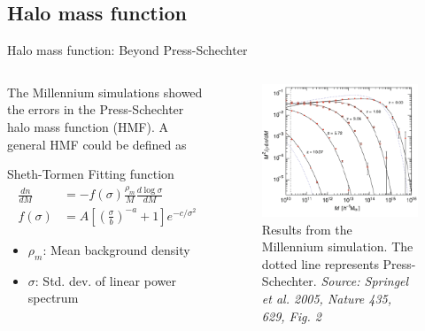 \documentclass{beamer}
\begin{document}
\subsection{Halo mass function}
	\begin{frame}{Halo mass function: Beyond Press-Schechter}
		\begin{columns}
			\begin{column}{0.45\textwidth}
				\small The Millennium simulations showed the errors in the Press-Schechter halo mass function (HMF). A general HMF could be defined as
				\begin{block}{Sheth-Tormen Fitting function}
					\begin{equation}
					\begin{aligned}
					\frac{dn}{dM}&=-f(\sigma)\frac{\rho_m}{M}\frac{d\log\sigma}{dM}\\
					f(\sigma)&= A\left[\left(\frac{\sigma}{b}\right)^{-a}+1\right]e^{-c/\sigma^2}
					\end{aligned}
					\end{equation}
				\end{block}
				\begin{itemize}
					\item $\rho_m$: Mean background density
					\item $\sigma$: Std. dev. of linear power spectrum
				\end{itemize}
			\end{column}
			\begin{column}{0.5\textwidth}
				\begin{figure}
					\includegraphics[width=\textwidth]{mill-hmf.png}
					\caption{\tiny Results from the Millennium simulation. The dotted line represents Press-Schechter. \emph{Source: Springel et al. 2005, Nature 435, 629, Fig. 2}}
					\label{fig:mill-sim}
				\end{figure}
			\end{column}
		\end{columns}
	\end{frame}
\end{document}
